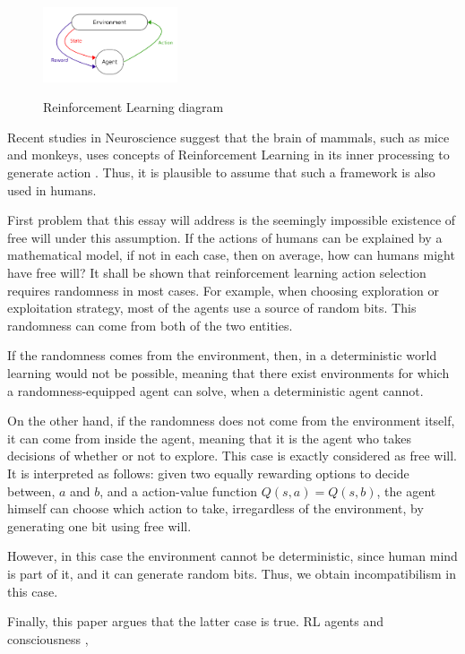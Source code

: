 \documentclass[a4paper]{article}
\begin{document}
\begin{figure}[h]
	\caption{Reinforcement Learning diagram}
	\centering \includegraphics[width=150px]{RL.png}
	\label{RL}
\end{figure}

Recent studies in Neuroscience suggest that the brain of mammals, such as mice and monkeys, uses concepts of Reinforcement Learning in its inner processing to generate action \cite{doyareward, doya2}. Thus, it is plausible to assume that such a framework is also used in humans.

First problem that this essay will address is the seemingly impossible existence of free will under this assumption. If the actions of humans can be explained by a mathematical model, if not in each case, then on average, how can humans might have free will? It shall be shown that reinforcement learning action selection requires randomness in most cases. For example, when choosing exploration or exploitation strategy, most of the agents use a source of random bits. This randomness can come from both of the two entities.

If the randomness comes from the environment, then, in a deterministic world learning would not be possible, meaning that there exist environments for which a randomness-equipped agent can solve, when a deterministic agent cannot.

On the other hand, if the randomness does not come from the environment itself, it can come from inside the agent, meaning that it is the agent who takes decisions of whether or not to explore. This case is exactly considered as free will. It is interpreted as follows: given two equally rewarding options to decide between, $a$ and $b$, and a action-value function $Q(s, a)=Q(s, b)$, the agent himself can choose which action to take, irregardless of the environment, by generating one bit using free will.

However, in this case the environment cannot be deterministic, since human mind is part of it, and it can generate random bits. Thus, we obtain incompatibilism in this case.

Finally, this paper argues that the latter case is true. RL agents and consciousness \cite{rlmorality1}, \cite{rlmorality2}
\end{document}
